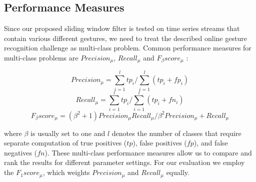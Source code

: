 \subsection{Performance Measures} \label{performance_measures}

Since our proposed sliding window filter is tested on time series streams that contain various different gestures, we need to treat the described online gesture recognition challenge as multi-class problem.
Common performance measures for multi-class problems are $Precision_{\mu}$, $Recall_{\mu}$ and $F_{\beta}score_{\mu}$ \cite{sokolova2009systematic}:

\begin{equation}
    Precision_{\mu} = {\sum \limits_{i=1}^{l} tp_i}  \bigg/  {\sum \limits_{i=1}^{l} (tp_i + fp_i)}
\end{equation}
\begin{equation}
    Recall_{\mu} = {\sum \limits_{i=1}^{l} tp_i} \bigg/{\sum \limits_{i=1}^{l} (tp_i + fn_i)}
\end{equation}
\begin{equation}
    F_{\beta}score_{\mu} = {(\beta^2 + 1)Precision_{\mu} Recall_{\mu}} \bigg/ {\beta^2 Precision_{\mu} + Recall_{\mu}}
\end{equation}

where $\beta$ is usually set to one and $l$ denotes the number of classes that require separate computation of true positives ($tp$), false positives ($fp$), and false negatives ($fn$).
These multi-class performance measures allow us to compare and rank the results for different parameter settings.
For our evaluation we employ the $F_{1}score_{\mu}$, which weights $Precision_{\mu}$ and $Recall_{\mu}$ equally.
